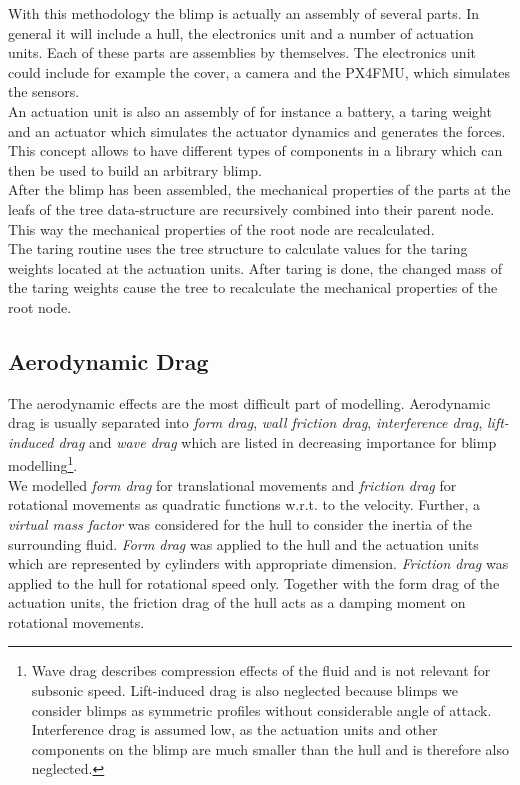 With this methodology the blimp is actually an assembly of several parts. 
In general it will include a hull, the electronics unit and a number of actuation units.
Each of these parts are assemblies by themselves.
The electronics unit could include for example the cover, a camera and the PX4FMU, which simulates the sensors.\\
An actuation unit is also an assembly of for instance a battery, a taring weight and an actuator which simulates the actuator dynamics and generates the forces.\\
This concept allows to have different types of components in a library which can then be used to build an arbitrary blimp. \\

After the blimp has been assembled, the mechanical properties of the parts at the leafs of the tree data-structure are recursively combined into their parent node.
This way the mechanical properties of the root node are recalculated.\\
The taring routine uses the tree structure to calculate values for the taring weights located at the actuation units. 
After taring is done, the changed mass of the taring weights cause the tree to recalculate the mechanical properties of the root node.

\subsection{Aerodynamic Drag}
\label{sub:aero_drag}
The aerodynamic effects are the most difficult part of modelling.
Aerodynamic drag is usually separated into \textit{form drag}, \textit{wall friction drag}, \textit{interference drag}, \textit{lift-induced drag} and \textit{wave drag} which are listed in decreasing importance for blimp modelling\footnote{
Wave drag describes compression effects of the fluid and is not relevant for subsonic speed.
Lift-induced drag is also neglected because blimps we consider blimps as symmetric profiles without considerable angle of attack.
Interference drag is assumed low, as the actuation units and other components on the blimp are much smaller than the hull and is therefore also neglected.
}.\\

We modelled \textit{form drag} for translational movements and \textit{friction drag} for rotational movements as quadratic functions w.r.t. to the velocity.
Further, a \textit{virtual mass factor} was considered for the hull to consider the inertia of the surrounding fluid.
\textit{Form drag} was applied to the hull and the actuation units which are represented by cylinders with appropriate dimension.
\textit{Friction drag} was applied to the hull for rotational speed only.
Together with the form drag of the actuation units, the friction drag of the hull acts as a damping moment on rotational movements.\\

